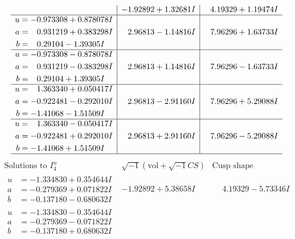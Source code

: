 \documentclass[1p]{elsarticle_modified}
\theoremstyle{definition}
\newcommand{\I}{\sqrt{-1}}
\begin{document}
$$\begin{array}{c|c|c}
 & -1.92892 + 1.32681 I & \phantom{-}4.19329 + 1.19474 I \\ \hline\begin{aligned}
u &= -0.973308 + 0.878078 I \\
a &= \phantom{-}0.931219 + 0.383298 I \\
b &= \phantom{-}0.29104 - 1.39305 I\end{aligned}
 & \phantom{-}2.96813 - 1.14816 I & \phantom{-}7.96296 + 1.63733 I \\ \hline\begin{aligned}
u &= -0.973308 - 0.878078 I \\
a &= \phantom{-}0.931219 - 0.383298 I \\
b &= \phantom{-}0.29104 + 1.39305 I\end{aligned}
 & \phantom{-}2.96813 + 1.14816 I & \phantom{-}7.96296 - 1.63733 I \\ \hline\begin{aligned}
u &= \phantom{-}1.363340 + 0.050417 I \\
a &= -0.922481 - 0.292010 I \\
b &= -1.41068 - 1.51509 I\end{aligned}
 & \phantom{-}2.96813 - 2.91160 I & \phantom{-}7.96296 + 5.29088 I \\ \hline\begin{aligned}
u &= \phantom{-}1.363340 - 0.050417 I \\
a &= -0.922481 + 0.292010 I \\
b &= -1.41068 + 1.51509 I\end{aligned}
 & \phantom{-}2.96813 + 2.91160 I & \phantom{-}7.96296 - 5.29088 I\\
 \hline 
 \end{array}$$\newpage$$\begin{array}{c|c|c}  
\text{Solutions to }I^u_{4}& \I (\text{vol} + \sqrt{-1}CS) & \text{Cusp shape}\\
 \hline 
\begin{aligned}
u &= -1.334830 + 0.354644 I \\
a &= -0.279369 + 0.071822 I \\
b &= -0.137180 - 0.680632 I\end{aligned}
 & -1.92892 + 5.38658 I & \phantom{-}4.19329 - 5.73346 I \\ \hline\begin{aligned}
u &= -1.334830 - 0.354644 I \\
a &= -0.279369 - 0.071822 I \\
b &= -0.137180 + 0.680632 I\end{aligned}

\end{array}$$
\end{document}
